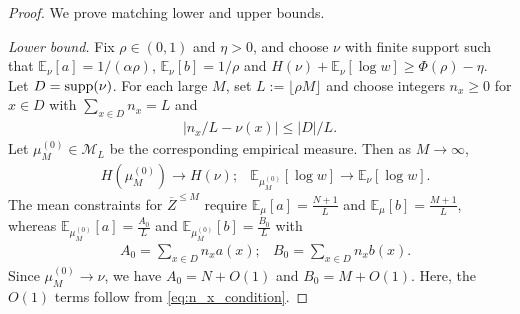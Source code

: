 \documentclass[11pt]{amsart}
\numberwithin{equation}{section}
\numberwithin{equation}{section}
\newcommand{\1}{\mathbbm{1}}
\newcommand{\E}{\mathbb{E}}
\newcommand{\supp}{\textup{supp}}
\theoremstyle{definition}
\begin{document}
\begin{proof}
We prove matching lower and upper bounds.

\medskip\noindent\emph{Lower bound.}
Fix $\rho\in(0,1)$ and $\eta>0$, and choose $\nu$ with finite support such that
$\E_\nu[a]=1/(\alpha\rho)$, $\E_\nu[b]=1/\rho$ and $H(\nu)+\E_\nu[\log w]\ge \Phi(\rho)-\eta$.
Let $D=\supp(\nu)$. For each large $M$, set $L:=\lfloor \rho M\rfloor$ and choose integers $n_x\ge 0$ for $x\in D$ with
$\sum_{x\in D}n_x=L$ and
\begin{align} \label{eq:n_x_condition}
    |n_x/L-\nu(x)|\le |D|/L.
\end{align}
Let $\mu_M^{(0)} \in \mathcal M_L$ be the corresponding empirical measure. Then as $M \to \infty$,
\begin{align*}
    & H(\mu_M^{(0)})\to H(\nu);
    & \E_{\mu_M^{(0)}}[\log w]\to \E_\nu[\log w].
\end{align*}
The mean constraints for $\overline{Z}^{\le M}$ require $\E_\mu[a]=\frac{N+1}{L}$ and $\E_\mu[b]=\frac{M+1}{L}$,
whereas $\E_{\mu_M^{(0)}}[a]=\frac{A_0}{L}$ and $\E_{\mu_M^{(0)}}[b]=\frac{B_0}{L}$ with
\begin{align*}
    & A_0=\sum_{x \in D} n_x a(x);
    & B_0=\sum_{x \in D} n_x b(x).
\end{align*}
Since $\mu_M^{(0)}\to\nu$, we have $A_0=N+O(1)$ and $B_0=M+O(1)$. Here, the $O(1)$ terms follow from \eqref{eq:n_x_condition}.


\end{proof}
\end{document}
